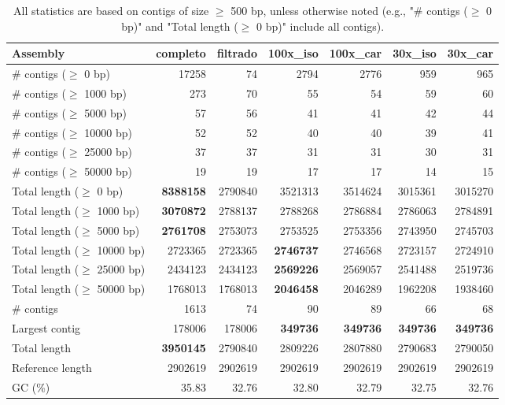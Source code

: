 \documentclass[12pt,a4paper]{article}
\begin{document}
\begin{table}[ht]
\begin{center}
\caption{All statistics are based on contigs of size $\geq$ 500 bp, unless otherwise noted (e.g., "\# contigs ($\geq$ 0 bp)" and "Total length ($\geq$ 0 bp)" include all contigs).}
\begin{tabular}{|l*{6}{|r}|}
\hline
Assembly & completo & filtrado & 100x\_iso & 100x\_car & 30x\_iso & 30x\_car \\ \hline
\# contigs ($\geq$ 0 bp) & 17258 & 74 & 2794 & 2776 & 959 & 965 \\ \hline
\# contigs ($\geq$ 1000 bp) & 273 & 70 & 55 & 54 & 59 & 60 \\ \hline
\# contigs ($\geq$ 5000 bp) & 57 & 56 & 41 & 41 & 42 & 44 \\ \hline
\# contigs ($\geq$ 10000 bp) & 52 & 52 & 40 & 40 & 39 & 41 \\ \hline
\# contigs ($\geq$ 25000 bp) & 37 & 37 & 31 & 31 & 30 & 31 \\ \hline
\# contigs ($\geq$ 50000 bp) & 19 & 19 & 17 & 17 & 14 & 15 \\ \hline
Total length ($\geq$ 0 bp) & {\bf 8388158} & 2790840 & 3521313 & 3514624 & 3015361 & 3015270 \\ \hline
Total length ($\geq$ 1000 bp) & {\bf 3070872} & 2788137 & 2788268 & 2786884 & 2786063 & 2784891 \\ \hline
Total length ($\geq$ 5000 bp) & {\bf 2761708} & 2753073 & 2753525 & 2753356 & 2743950 & 2745703 \\ \hline
Total length ($\geq$ 10000 bp) & 2723365 & 2723365 & {\bf 2746737} & 2746568 & 2723157 & 2724910 \\ \hline
Total length ($\geq$ 25000 bp) & 2434123 & 2434123 & {\bf 2569226} & 2569057 & 2541488 & 2519736 \\ \hline
Total length ($\geq$ 50000 bp) & 1768013 & 1768013 & {\bf 2046458} & 2046289 & 1962208 & 1938460 \\ \hline
\# contigs & 1613 & 74 & 90 & 89 & 66 & 68 \\ \hline
Largest contig & 178006 & 178006 & {\bf 349736} & {\bf 349736} & {\bf 349736} & {\bf 349736} \\ \hline
Total length & {\bf 3950145} & 2790840 & 2809226 & 2807880 & 2790683 & 2790050 \\ \hline
Reference length & 2902619 & 2902619 & 2902619 & 2902619 & 2902619 & 2902619 \\ \hline
GC (\%) & 35.83 & 32.76 & 32.80 & 32.79 & 32.75 & 32.76 \\ \hline

\end{tabular}
\end{center}
\end{table}
\end{document}

